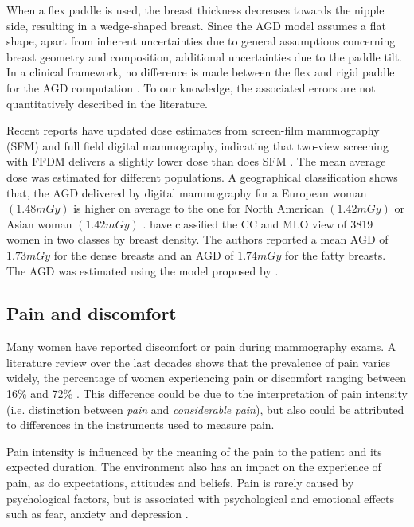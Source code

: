  When a flex paddle is used, the breast thickness decreases towards the nipple side, resulting in a wedge-shaped breast.  Since the AGD model assumes a flat shape, apart from inherent uncertainties due to general assumptions concerning breast geometry and composition, additional uncertainties due to the paddle tilt. In a clinical framework, no difference is made between the flex and rigid paddle for the AGD computation \citep{broeders_comparison_2015}. To our knowledge, the associated errors are not quantitatively described in the literature.  

Recent reports have updated dose estimates from screen-film mammography (SFM) and full field digital mammography, indicating that two-view screening with FFDM delivers a slightly lower dose than does SFM . The mean average dose was estimated for different populations. A geographical classification shows that, the AGD delivered by digital mammography for a European woman  $(1.48 mGy)$ is higher on average to the one for North American $(1.42 mGy)$ or Asian woman $(1.42 mGy)$ \citep{geeraert_breast_2012}. \cite{osteraas_average_2018} have classified the CC and MLO view of 3819 women in two classes by breast density. The authors reported a mean AGD of $1.73 mGy$ for the dense breasts and an AGD of $1.74 mGy$ for the fatty breasts. The AGD was estimated using the model proposed by \cite{dance_additional_2000} .  


\subsection{Pain and discomfort}
Many women have reported discomfort or pain during mammography exams. A literature review over the last decades shows that the  prevalence of pain varies widely, the percentage of women experiencing pain or discomfort ranging between 16\% and 72\% \citep{keemers_pain_2000, peipins_impact_2006,dullum_rates_2000, whelehan_effect_2013}. This difference could be due to the interpretation of pain intensity (i.e. distinction between \textit{pain} and \textit{considerable pain}),  but also could be attributed to differences in the instruments used to measure pain. 

Pain intensity is influenced by the meaning of the pain to the patient and its expected duration. The environment also has an impact on the experience of pain, as do expectations, attitudes and beliefs. Pain is rarely caused by psychological factors, but is associated with psychological and emotional effects such as fear, anxiety and
depression \citep{williamson_pain_2005}.

